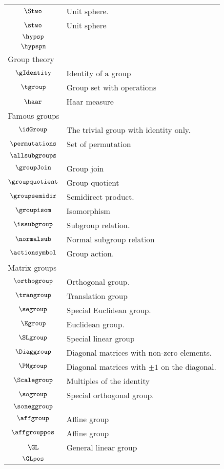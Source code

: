 \begin{longtable}{cl}
 $\Stwo$ &  Unit sphere.\\ 
 $\stwo$ &  Unit sphere\\ 
 $\hypsp$ & \\ 
 $\hypspn$ & \\ 
 \multicolumn{2}{l}{Group theory}\\ 
 \hline
$\gIdentity$ &  Identity of a group\\ 
 $\tgroup$ &  Group set with operations\\ 
 $\haar$ &  Haar measure\\ 
 \multicolumn{2}{l}{Famous groups}\\ 
 \hline
$\idGroup$ &  The trivial group with identity only.\\ 
 $\permutations$ &  Set of permutation\\ 
 $\allsubgroups$ & \\ 
 $\groupJoin$ &  Group join\\ 
 $\groupquotient$ &  Group quotient\\ 
 $\groupsemidir$ &  Semidirect product.\\ 
 $\groupisom$ &  Isomorphism\\ 
 $\issubgroup$ &  Subgroup relation.\\ 
 $\normalsub$ &  Normal subgroup relation\\ 
 $\actionsymbol$ &  Group action.\\ 
 \multicolumn{2}{l}{Matrix groups}\\ 
 \hline
$\orthogroup$ &  Orthogonal group.\\ 
 $\trangroup$ &   Translation group\\ 
 $\segroup$ &  Special Euclidean group.\\ 
 $\Egroup$ &   Euclidean group.\\ 
 $\SLgroup$ &   Special linear group\\ 
 $\Diaggroup$ &   Diagonal matrices with non-zero elements.\\ 
 $\PMgroup$ &   Diagonal matrices with $\pm 1$ on the diagonal.\\ 
 $\Scalegroup$ &   Multiples of the identity\\ 
 $\sogroup$ &  Special orthogonal group.\\ 
 $\soneggroup$ & \\ 
 $\affgroup$ &  Affine group \\ 
 $\affgrouppos$ &  Affine group \\ 
 $\GL$ &  General linear group\\ 
 $\GLpos$ &  \\ 

\end{longtable}
